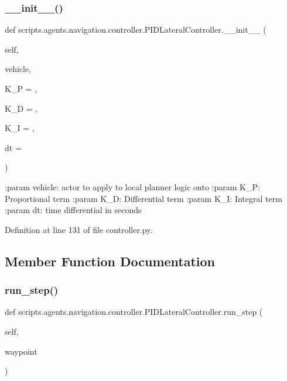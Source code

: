 \subsubsection{\texorpdfstring{\+\_\+\+\_\+init\+\_\+\+\_\+()}{\_\_init\_\_()}}
{\footnotesize\ttfamily def scripts.\+agents.\+navigation.\+controller.\+P\+I\+D\+Lateral\+Controller.\+\_\+\+\_\+init\+\_\+\+\_\+ (\begin{DoxyParamCaption}\item[{}]{self,  }\item[{}]{vehicle,  }\item[{}]{K\+\_\+P = {},  }\item[{}]{K\+\_\+D = {},  }\item[{}]{K\+\_\+I = {},  }\item[{}]{dt = {} }\end{DoxyParamCaption})}

\begin{DoxyVerb}:param vehicle: actor to apply to local planner logic onto
:param K_P: Proportional term
:param K_D: Differential term
:param K_I: Integral term
:param dt: time differential in seconds
\end{DoxyVerb}
 

Definition at line 131 of file controller.\+py.



\subsection{Member Function Documentation}
\mbox{\label{classscripts_1_1agents_1_1navigation_1_1controller_1_1PIDLateralController_a6f0bbd083ff0c9b013ca8b4ce476f24e}} 
\subsubsection{\texorpdfstring{run\+\_\+step()}{run\_step()}}
{\footnotesize\ttfamily def scripts.\+agents.\+navigation.\+controller.\+P\+I\+D\+Lateral\+Controller.\+run\+\_\+step (\begin{DoxyParamCaption}\item[{}]{self,  }\item[{}]{waypoint }\end{DoxyParamCaption})}

